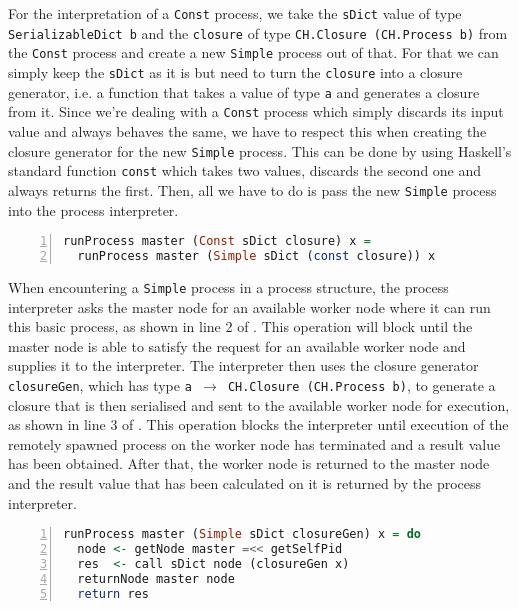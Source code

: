 For the interpretation of a \texttt{Const} process, we take the \texttt{sDict} value of type \texttt{SerializableDict b} and the \texttt{closure} of type \texttt{CH.Closure (CH.Process b)} from the \texttt{Const} process and create a new \texttt{Simple} process out of that. For that we can simply keep the \texttt{sDict} as it is but need to turn the \texttt{closure} into a closure generator, i.e. a function that takes a value of type \texttt{a} and generates a closure from it. Since we're dealing with a \texttt{Const} process which simply discards its input value and always behaves the same, we have to respect this when creating the closure generator for the new \texttt{Simple} process. This can be done by using Haskell's standard function \texttt{const} which takes two values, discards the second one and always returns the first. Then, all we have to do is pass the new \texttt{Simple} process into the process interpreter.
\begin{lstlisting}[language=Haskell,caption=Implementation of the interpreter of \texttt{Const} processes.,label=lst:runprocess_const,numbers=left,frame=bt]
runProcess master (Const sDict closure) x =
  runProcess master (Simple sDict (const closure)) x
\end{lstlisting}

When encountering a \texttt{Simple} process in a process structure, the process interpreter asks the master node for an available worker node where it can run this basic process, as shown in line 2 of . This operation will block until the master node is able to satisfy the request for an available worker node and supplies it to the interpreter. The interpreter then uses the closure generator \texttt{closureGen}, which has type \texttt{a $\to$ CH.Closure (CH.Process b)}, to generate a closure that is then serialised and sent to the available worker node for execution, as shown in line 3 of . This operation blocks the interpreter until execution of the remotely spawned process on the worker node has terminated and a result value has been obtained. After that, the worker node is returned to the master node and the result value that has been calculated on it is returned by the process interpreter.
\begin{lstlisting}[language=Haskell,caption=Implementation of the interpreter for \texttt{Simple} processes.,label=lst:runprocess_simple,numbers=left,frame=bt]
runProcess master (Simple sDict closureGen) x = do
  node <- getNode master =<< getSelfPid
  res  <- call sDict node (closureGen x)
  returnNode master node
  return res
\end{lstlisting}

